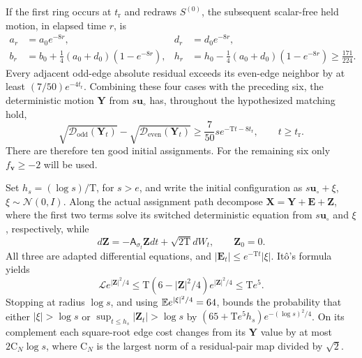 If the first ring occurs at \(t_{\mathrm r}\) and redraws \(S^{(0)}\),
the subsequent scalar-free held motion, in elapsed time \(r\), is
\[
 \begin{aligned}
 a_r&=a_0e^{-8r},&d_r&=d_0e^{-8r},\\
 b_r&=b_0+\tfrac14(a_0+d_0)(1-e^{-8r}),&
 h_r&=h_0-\tfrac14(a_0+d_0)(1-e^{-8r})\ge\tfrac{171}{224}.
 \end{aligned}
\]
Every adjacent odd-edge absolute residual exceeds its even-edge neighbor
by at least \((7/50)e^{-4t_{\mathrm r}}\). Combining these four cases
with the preceding six, the deterministic motion \(\mathbf Y\) from
\(s\mathbf u_\circ\) has, throughout the hypothesized matching hold,
\begin{equation}
 \sqrt{\mathcal D_{\mathrm{odd}}(\mathbf Y_t)}
 -\sqrt{\mathcal D_{\mathrm{even}}(\mathbf Y_t)}
 \ge\frac7{50}s e^{-\mathrm Tt-8t_{\mathrm r}},
 \qquad t\ge t_{\mathrm r}.
\label{eq:phil-selection-lock-margin}
\end{equation}
There are therefore ten good initial assignments. For the remaining six
only \(f_{\mathbf v}\ge-2\) will be used.

Set \(h_s=(\log s)/\mathrm T\), for \(s>e\), and write the initial
configuration as \(s\mathbf u_\circ+\xi\), \(\xi\sim\mathcal N(0,I)\).
Along the actual assignment path decompose
\(\mathbf X=\mathbf Y+\mathbf E+\mathbf Z\), where the first two terms
solve its switched deterministic equation from \(s\mathbf u_\circ\) and
\(\xi\), respectively, while
\[
 d\mathbf Z=-\mathsf A_{\sigma_t}\mathbf Zdt+\sqrt{2\mathrm T}dW_t,
 \qquad\mathbf Z_0=0.
\]
All three are adapted differential equations, and
\(|\mathbf E_t|\le e^{-\mathrm Tt}|\xi|\).
It\^o's formula yields
\[
 \mathscr L e^{|\mathbf Z|^2/4}
 \le\mathrm T(6-|\mathbf Z|^2/4)e^{|\mathbf Z|^2/4}
 \le\mathrm Te^5.
\]
Stopping at radius \(\log s\), and using
\(\mathbb E e^{|\xi|^2/4}=64\), bounds the probability that either
\(|\xi|>\log s\) or \(\sup_{t\le h_s}|\mathbf Z_t|>\log s\) by
\((65+\mathrm Te^5h_s)e^{-(\log s)^2/4}\).
On its complement each square-root edge cost changes from its
\(\mathbf Y\) value by at most \(2\mathrm C_N\log s\), where
\(\mathrm C_N\) is the largest norm of a residual-pair map divided by
\(\sqrt2\).

